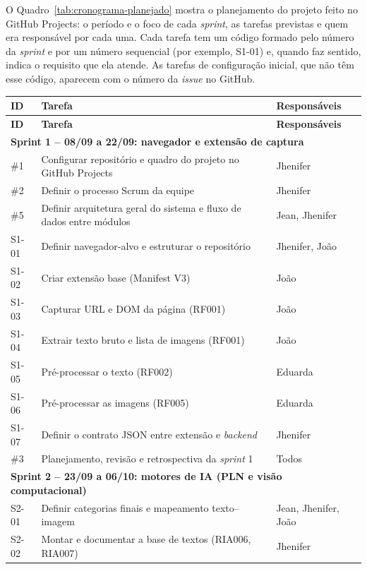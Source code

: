 \documentclass[
    12pt,           %
    oneside,        %
    a4paper,        %
    chapter=TITLE,  %
    english,        %
    brazil          %
]{abntex2}
\begin{document}
O Quadro~\ref{tab:cronograma-planejado} mostra o planejamento do projeto
feito no GitHub Projects: o período e o foco de cada \textit{sprint}, as
tarefas previstas e quem era responsável por cada uma. Cada tarefa tem um
código formado pelo número da \textit{sprint} e por um número sequencial (por
exemplo, S1-01) e, quando faz sentido, indica o requisito que ela atende. As
tarefas de configuração inicial, que não têm esse código, aparecem com o
número da \textit{issue} no GitHub.
{\small
\begin{longtable}{|p{1.5cm}|p{9.0cm}|p{3.3cm}|}
\hline
\textbf{ID} & \textbf{Tarefa} & \textbf{Responsáveis} \\ \hline
\endfirsthead
\hline
\textbf{ID} & \textbf{Tarefa} & \textbf{Responsáveis} \\ \hline
\endhead
\multicolumn{3}{|l|}{\textbf{Sprint 1 -- 08/09 a 22/09: navegador e extensão de captura}} \\ \hline
\#1 & Configurar repositório e quadro do projeto no GitHub Projects & Jhenifer \\ \hline
\#2 & Definir o processo Scrum da equipe & Jhenifer \\ \hline
\#5 & Definir arquitetura geral do sistema e fluxo de dados entre módulos & Jean, Jhenifer \\ \hline
S1-01 & Definir navegador-alvo e estruturar o repositório & Jhenifer, João \\ \hline
S1-02 & Criar extensão base (Manifest V3) & João \\ \hline
S1-03 & Capturar URL e DOM da página (RF001) & João \\ \hline
S1-04 & Extrair texto bruto e lista de imagens (RF001) & João \\ \hline
S1-05 & Pré-processar o texto (RF002) & Eduarda \\ \hline
S1-06 & Pré-processar as imagens (RF005) & Eduarda \\ \hline
S1-07 & Definir o contrato JSON entre extensão e \textit{backend} & Jhenifer \\ \hline
\#3 & Planejamento, revisão e retrospectiva da \textit{sprint} 1 & Todos \\ \hline
\multicolumn{3}{|l|}{\textbf{Sprint 2 -- 23/09 a 06/10: motores de IA (PLN e visão computacional)}} \\ \hline
S2-01 & Definir categorias finais e mapeamento texto--imagem & Jean, Jhenifer, João \\ \hline
S2-02 & Montar e documentar a base de textos (RIA006, RIA007) & Jhenifer \\ \hline

\end{longtable}}
\end{document}
